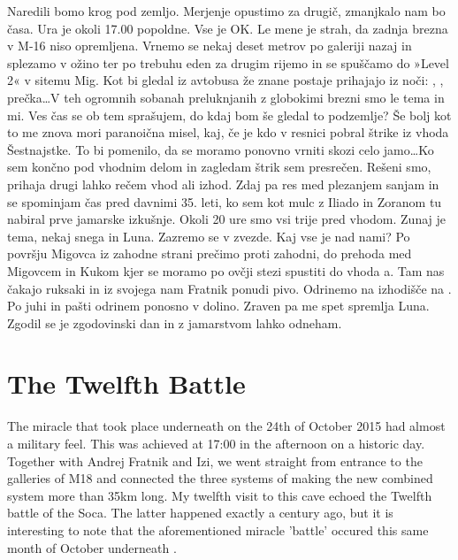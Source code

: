 Naredili bomo krog pod zemljo. Merjenje opustimo za drugič, zmanjkalo nam bo časa. Ura je okoli 17.00 popoldne. Vse je OK. Le mene je strah, da zadnja brezna v M-16 niso opremljena. Vrnemo se nekaj deset metrov po galeriji nazaj in splezamo v ožino ter po trebuhu eden za drugim rijemo in se spuščamo do »Level 2« v sitemu Mig. Kot bi gledal iz avtobusa že znane postaje prihajajo iz noči: , ,  prečka…V teh ogromnih sobanah preluknjanih z globokimi brezni smo le tema in mi. Ves čas se ob tem sprašujem, do kdaj bom še gledal to podzemlje? Še bolj kot to me znova mori paranoična misel, kaj, če je kdo v resnici pobral štrike iz vhoda Šestnajstke. To bi pomenilo, da se moramo ponovno vrniti skozi celo jamo…Ko sem končno pod vhodnim delom in zagledam štrik sem presrečen. Rešeni smo, prihaja drugi lahko rečem vhod ali izhod. Zdaj pa res med plezanjem sanjam in se spominjam čas pred davnimi 35. leti, ko sem kot mulc z Iliado in Zoranom tu nabiral prve jamarske izkušnje. Okoli 20 ure smo vsi trije pred vhodom. Zunaj je tema, nekaj snega in Luna. Zazremo se v zvezde. Kaj vse je nad nami? Po površju Migovca iz zahodne strani prečimo proti zahodni, do prehoda med Migovcem in Kukom kjer se moramo po ovčji stezi spustiti do vhoda a. Tam nas čakajo ruksaki in iz svojega nam Fratnik ponudi pivo. Odrinemo na izhodišče na . Po juhi in pašti odrinem ponosno v dolino. Zraven pa me spet spremlja Luna. Zgodil se je zgodovinski dan in z jamarstvom lahko odneham.  
 


\section{The Twelfth Battle}


The miracle that took place underneath  on the 24th of October 2015 had almost a military feel. This was achieved at 17:00 in the afternoon on a historic day. Together with Andrej Fratnik and Izi, we went straight from  entrance to the galleries of M18 and connected the three systems of  making the new combined system more than 35km long. My twelfth visit to this cave echoed the Twelfth battle of the Soca. The latter happened exactly a century ago, but it is interesting to note that the aforementioned miracle 'battle' occured this same month of October underneath .   

